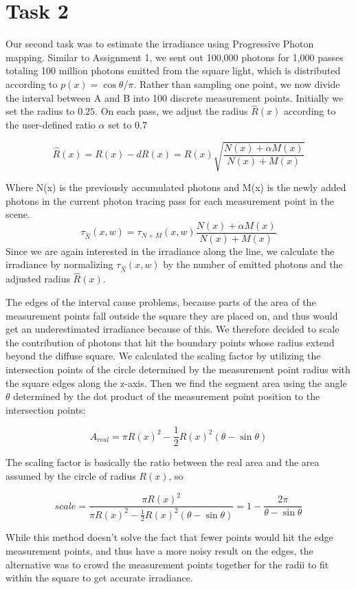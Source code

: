 \section*{Task 2}
Our second task was to estimate the irradiance using Progressive Photon mapping. Similar to Assignment 1, we sent out 100,000 photons for 1,000 passes totaling 100 million photons emitted from the square light, which is distributed according to $p(x)=\cos \theta/\pi$. Rather than sampling one point, we now divide the interval between A and B into 100 discrete measurement points. Initially we set the radius to $0.25$. On each pass, we adjust the radius $ \hat{R}(x) $ according to the user-defined ratio $ \alpha $ set to 0.7

$$ \hat{R}(x) = R(x) - dR(x) = R(x)\sqrt{\frac{N(x)+\alpha M(x)}{N(x)+M(x)}} $$

Where N(x) is the previously accumulated photons and M(x) is the newly added photons in the current photon tracing pass for each measurement point in the scene.
$$ \tau_{\hat{N}}(x, w) = \tau_{N+M}(x, w)\frac{N(x) + \alpha M(x)}{N(x) + M(x)} $$
Since we are again interested in the irradiance along the line, we calculate the irradiance by normalizing $ \tau_{\hat{N}}(x, w) $ by the number of emitted photons and the adjusted radius $\hat{R}(x)$.

The edges of the interval cause problems, because parts of the area of the measurement points fall outside the square they are placed on, and thus would get an underestimated irradiance because of this. We therefore decided to scale the contribution of photons that hit the boundary points whose radius extend beyond the diffuse square. We calculated the scaling factor by utilizing the intersection points of the circle determined by the measurement point radius with the square edges along the z-axis. Then we find the segment area using the angle $\theta$ determined by the dot product of the measurement point position to the intersection points:

$$ A_{real} = \pi R(x)^2 - \frac{1}{2} R(x)^2 (\theta - \sin{\theta}) $$

The scaling factor is basically the ratio between the real area and the area assumed by the circle of radius $R(x)$, so

$$scale = \frac{\pi R(x)^2}{\pi R(x)^2 - \frac{1}{2} R(x)^2 (\theta - \sin{\theta})} = 1-\frac{2\pi}{\theta - \sin{\theta}}$$

While this method doesn't solve the fact that fewer points would hit the edge measurement points, and thus have a more noisy result on the edges, the alternative was to crowd the measurement points together for the radii to fit within the square to get accurate irradiance. 

